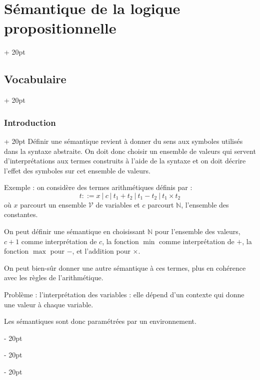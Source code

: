 \documentclass[a4paper, 12pt, twoside]{article}
\newcommand{\N}{\mathbb{N}} %
\newcommand{\ind}[1][20pt]{\advance\leftskip + #1}
\newcommand{\deind}[1][20pt]{\advance\leftskip - #1}
\newenvironment{indt}[2][20pt]{#2 \par \ind[#1]}{\par \deind} %
\begin{document}
    \begin{indt}{\section{Sémantique de la logique propositionnelle}}
        
        \begin{indt}{\subsection{Vocabulaire}}
            \begin{indt}{\subsubsection{Introduction}}
                Définir une sémantique revient à donner du sens aux symboles utilisés dans la syntaxe abstraite. On doit donc choisir un ensemble de valeurs qui servent d'interprétations aux termes construits à l'aide de la syntaxe et on doit décrire l'effet des symboles sur cet ensemble de valeurs.
                
                \vspace{12pt}
                
                Exemple : on considère des termes arithmétiques définis par :
                    \[ t ::= x\ |\ c\ |\ t_1 + t_2\ |\ t_1 - t_2\ |\ t_1 \times t_2 \]
                où $x$ parcourt un ensemble $\mathcal V$ de variables et $c$ parcourt $\N$, l'ensemble des constantes.
                
                On peut définir une sémantique en choisissant $\N$ pour l'ensemble des valeurs, $c + 1$ comme interprétation de $c$, la fonction $\min$ comme interprétation de $+$, la fonction $\max$ pour $-$, et l'addition pour $\times$.
                
                On peut bien-sûr donner une autre sémantique à ces termes, plus en cohérence avec les règles de l'arithmétique.
                
                Problème : l'interprétation des variables : elle dépend d'un contexte qui donne une valeur à chaque variable.
                
                Les sémantiques sont donc paramétrées par un environnement.
            \end{indt}
            
            \vspace{12pt}
            

\end{indt}
\end{indt}
\end{document}

